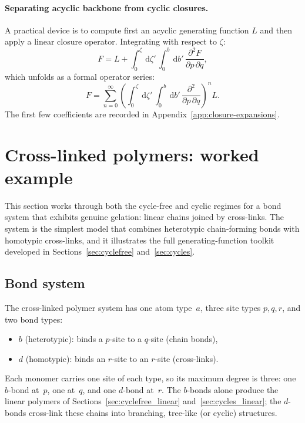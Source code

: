 \documentclass[11pt]{amsart}
\newcommand{\GFspecies}{F}
\newcommand{\dd}{\,\mathrm{d}}
\theoremstyle{definition}
\theoremstyle{plain}
\theoremstyle{remark}
\begin{document}
\paragraph{Separating acyclic backbone from cyclic closures.}
A practical device is to compute first an acyclic generating function $L$ and then apply a linear closure operator.
Integrating with respect to $\zeta$:
\[
\GFspecies = L + \int_0^{\zeta} \dd \zeta'\,\int_0^b \dd b'\,\frac{\partial^2\GFspecies}{\partial p\,\partial q},
\]
which unfolds as a formal operator series:
\[
\GFspecies = \sum_{n=0}^\infty \left(\int_0^{\zeta} \dd \zeta'\,\int_0^b \dd b'\,\frac{\partial^2}{\partial p\,\partial q}\right)^n L.
\]
The first few coefficients are recorded in Appendix~\ref{app:closure-expansions}.


\section{Cross-linked polymers: worked example}
\label{sec:crosslinked}

This section works through both the cycle-free and cyclic regimes for a bond system that exhibits genuine gelation: linear chains joined by cross-links.
The system is the simplest model that combines heterotypic chain-forming bonds with homotypic cross-links, and it illustrates the full generating-function toolkit developed in Sections~\ref{sec:cyclefree} and~\ref{sec:cycles}.

\subsection{Bond system}
\label{sec:crosslinked_bond_system}

The cross-linked polymer system has one atom type~$a$, three site types $p,q,r$, and two bond types:
\begin{itemize}
\item $b$ (heterotypic): binds a $p$-site to a $q$-site (chain bonds),
\item $d$ (homotypic): binds an $r$-site to an $r$-site (cross-links).
\end{itemize}
Each monomer carries one site of each type, so its maximum degree is three: one $b$-bond at~$p$, one at~$q$, and one $d$-bond at~$r$.
The $b$-bonds alone produce the linear polymers of Sections~\ref{sec:cyclefree_linear} and~\ref{sec:cycles_linear}; the $d$-bonds cross-link these chains into branching, tree-like (or cyclic) structures.
\end{document}
